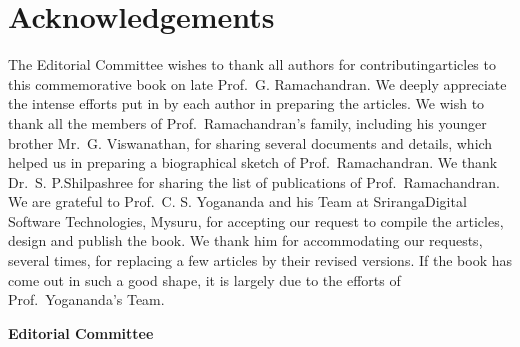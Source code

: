\chapter*{Acknowledgements}

The Editorial Committee wishes to thank all authors for contributing\break articles to this commemorative book on late Prof.\ G. Ramachandran. We deeply appreciate the intense efforts put in by each author in preparing the articles. We wish to thank all the members of Prof.\ Ramachandran's family, including his younger brother Mr.\ G. Viswanathan, for sharing several documents and details, which helped us in preparing a biographical sketch of Prof.\ Ramachandran. We thank Dr.\ S. P.\break Shilpashree for sharing the list of publications of Prof.\ Ramachandran. We are grateful to Prof.\ C. S. Yogananda and his Team at Sriranga\break Digital Software Technologies, Mysuru, for accepting our request to compile the articles, design and publish the book. We thank him for accommodating our requests, several times, for replacing a few articles by their revised versions. If the book has come out in such a good shape, it is largely due to the efforts of Prof.\ Yogananda's Team.  
\bigskip

\hfill	{\bf Editorial Committee}
